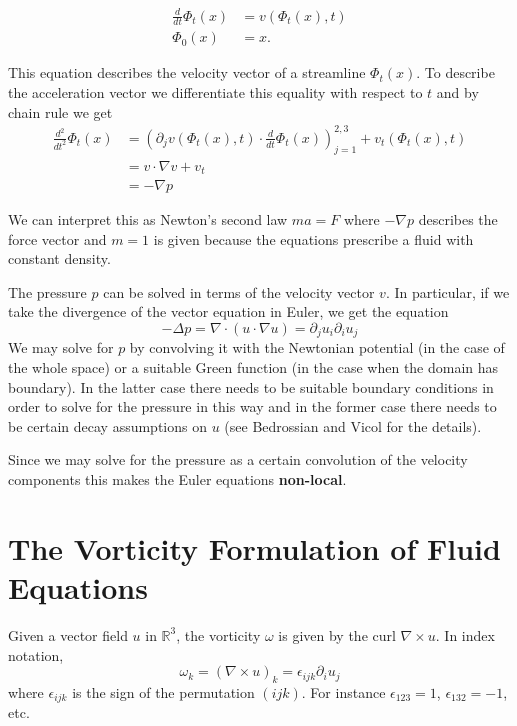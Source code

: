 \[ 
\begin{aligned}
\frac{d}{dt}\Phi_t(x) &= v(\Phi_t(x), t) \\
\Phi_0(x) &= x.
\end{aligned}
\]

This equation describes the velocity vector of a streamline $\Phi_t(x)$. To describe the acceleration vector we differentiate this equality with respect to $t$ and by chain rule we get
\[\begin{aligned}
    \frac{d^2}{dt^2}\Phi_t(x) &= \left(\partial_jv(\Phi_t(x), t)\cdot \frac{d}{dt}\Phi_t(x)\right)_{j = 1}^{2,3} + v_t(\Phi_t(x), t) \\
    &= v \cdot \nabla v + v_t \\
    &= -\nabla p
\end{aligned}\]

We can interpret this as Newton's second law $ma = F$ where $-\nabla p$ describes the force vector and $m = 1$ is given because the equations prescribe a fluid with constant density.

The pressure $p$ can be solved in terms of the velocity vector $v$. In particular, if we take the divergence of the vector equation in Euler, we get the equation
\[-\Delta p = \nabla \cdot (u \cdot \nabla u) = \partial_ju_i \partial_i u_j\]
We may solve for $p$ by convolving it with the Newtonian potential (in the case of the whole space) or a suitable Green function (in the case when the domain has boundary). In the latter case there needs to be suitable boundary conditions in order to solve for the pressure in this way and in the former case there needs to be certain decay assumptions on $u$ (see Bedrossian and Vicol for the details).

Since we may solve for the pressure as a certain convolution of the velocity components this makes the Euler equations \textbf{non-local}.

\section{The Vorticity Formulation of Fluid Equations}

\begin{definition}
    Given a vector field $u$ in $\mathbb{R}^3$, the vorticity $\omega$ is given by the curl $\nabla \times u$. In index notation,
    \[\omega_k = (\nabla \times u)_k = \epsilon_{ijk}\partial_iu_j\]
    where $\epsilon_{ijk}$ is the sign of the permutation $(ijk)$. For instance $\epsilon_{123} = 1$, $\epsilon_{132} = -1$, etc.
\end{definition}

